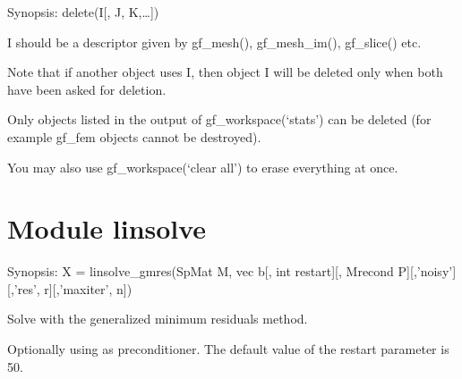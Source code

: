 \documentclass[a4paper,11pt,english]{sphinxmanual}
\begin{document}
\begin{fulllineitems}
\label{\detokenize{python/cmdref_Module delete:getfem.delete}}
Synopsis: delete(I{[}, J, K,…{]})

I should be a descriptor given by gf\_mesh(),
gf\_mesh\_im(), gf\_slice() etc.

Note that if another object uses I, then object I will be deleted only
when both have been asked for deletion.

Only objects listed in the output of gf\_workspace(‘stats’) can be
deleted (for example gf\_fem objects cannot be destroyed).

You may also use gf\_workspace(‘clear all’) to erase everything at
once.

\end{fulllineitems}



\section{Module linsolve}
\label{\detokenize{python/cmdref_Module linsolve:module-linsolve}}\label{\detokenize{python/cmdref_Module linsolve::doc}}

\begin{fulllineitems}
\label{\detokenize{python/cmdref_Module linsolve:getfem.linsolve_gmres}}
Synopsis: X = linsolve\_gmres(SpMat M, vec b{[}, int restart{]}{[}, Mrecond P{]}{[},’noisy’{]}{[},’res’, r{]}{[},’maxiter’, n{]})

Solve  with the generalized minimum residuals method.

Optionally using  as preconditioner. The default value of the
restart parameter is 50.

\end{fulllineitems}

\end{document}
